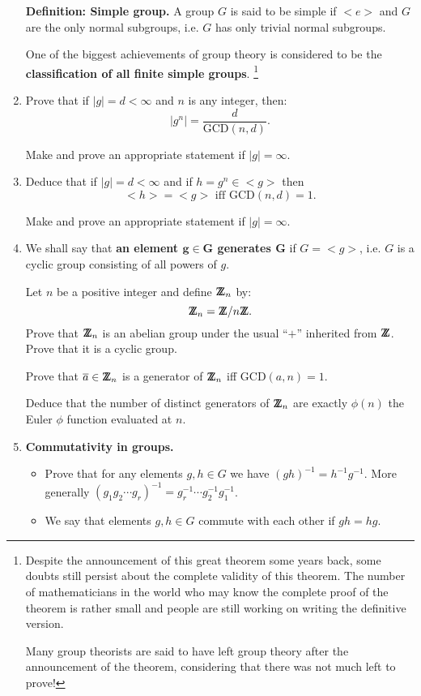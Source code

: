 \documentclass[12pt]{article}
\newcommand{\deff}[1]{{\bf Definition: #1} }
\def\DZ{ \mbox{\rm Z \kern -0.75em Z} }
\begin{document}
\begin{enumerate}
\deff{Simple group.}
A group $G$ is said to be simple if $<e>$ and $G$ are the only normal
subgroups, i.e. $G$ has only trivial normal subgroups.

One of the biggest achievements of group theory is considered to be the
{\bf classification of all finite simple groups}.
\footnote{Despite the announcement of this great theorem some years
back, some doubts still persist about the complete validity of this
theorem. The number of mathematicians in the world who may know the
complete proof of the theorem is rather small and people are still
working on writing the definitive version. 

Many group theorists are said to have left group theory after the
announcement of the theorem, considering that there was not much left to
prove!}

\item Prove that if $|g|=d<\infty$ and $n$ is any integer,
then:
$$|g^n| = \frac{d}{\mbox{GCD}(n,d)}.$$

Make and prove an appropriate statement if $|g|=\infty$.

\item  Deduce that if $|g|=d<\infty$ and if $h=g^n \in <g>$ then 
$$<h>=<g> \mbox{ iff } \mbox{GCD}(n,d)=1.$$

Make and prove an appropriate statement if $|g|=\infty$.
\item 
We shall say that {\bf an element $\mathbf{g\in G}$ generates $\mathbf{G}$} if
$G=<g>$, i.e. $G$ is a cyclic group consisting of all powers of $g$.

Let $n$ be a positive integer and define $\DZ_n$ by:
$$\DZ_n = \DZ/n\DZ.$$
Prove that $\DZ_n$ is an abelian group under the usual ``$+$'' inherited from $\DZ$.
Prove that it is a cyclic group.

Prove that $\overline{a}\in \DZ_n$ is a generator of $\DZ_n$ iff $\mbox{GCD}(a,n)=1$.

Deduce that the number of distinct generators of $\DZ_n$ are exactly
$\phi(n)$ the Euler $\phi$ function evaluated at $n$.

\item {\bf Commutativity in groups.}
\begin{itemize}
\item Prove that for any elements $g,h\in G$ we have
$(gh)^{-1}=h^{-1}g^{-1}$. More generally $(g_1g_2\cdots g_r)^{-1} =
g_r^{-1}\cdots g_2^{-1}g_1^{-1}$.

\item We say that elements $g,h\in G$ commute with each other if
$gh=hg$.


\end{itemize}
\end{enumerate}
\end{document}
